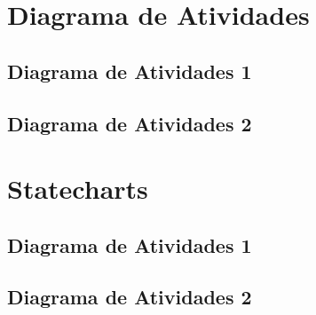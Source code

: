 \documentclass[brazil,times]{abnt}
\begin{document}
\section{Diagrama de Atividades}
\subsection{Diagrama de Atividades 1}


\subsection{Diagrama de Atividades 2}


\section{Statecharts}
\subsection{Diagrama de Atividades 1}


\subsection{Diagrama de Atividades 2}
\end{document}
